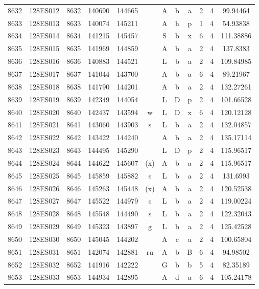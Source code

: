 \begin{tabular}{|*{12}{c|}}
8632 & 128ES012 & 8632 & 140690 & 144665 &  & A & b & a & 2 & 4 & 99.94464 \\ 
8633 & 128ES013 & 8633 & 140074 & 145211 &  & A & h & p & 1 & 4 & 54.93838 \\ 
8634 & 128ES014 & 8634 & 141215 & 145457 &  & S & b & x & 6 & 4 & 111.38886 \\ 
8635 & 128ES015 & 8635 & 141969 & 144859 &  & A & b & a & 2 & 4 & 137.8383 \\ 
8636 & 128ES016 & 8636 & 140883 & 144521 &  & L & b & a & 2 & 4 & 109.84985 \\ 
8637 & 128ES017 & 8637 & 141044 & 143700 &  & A & b & a & 6 & 4 & 89.21967 \\ 
8638 & 128ES018 & 8638 & 141790 & 144201 &  & A & b & a & 2 & 4 & 132.27261 \\ 
8639 & 128ES019 & 8639 & 142349 & 144054 &  & L & D & p & 2 & 4 & 101.66528 \\ 
8640 & 128ES020 & 8640 & 142437 & 143594 & w & L & D & x & 6 & 4 & 120.12128 \\ 
8641 & 128ES021 & 8641 & 143060 & 143903 & s & L & b & a & 2 & 4 & 132.04857 \\ 
8642 & 128ES022 & 8642 & 143422 & 144240 &  & A & b & a & 2 & 4 & 135.17114 \\ 
8643 & 128ES023 & 8643 & 144495 & 145290 &  & L & D & p & 2 & 4 & 115.96517 \\ 
8644 & 128ES024 & 8644 & 144622 & 145607 & (x) & A & b & a & 2 & 4 & 115.96517 \\ 
8645 & 128ES025 & 8645 & 145859 & 145882 & s & L & b & a & 2 & 4 & 131.6993 \\ 
8646 & 128ES026 & 8646 & 145263 & 145448 & (x) & A & b & a & 2 & 4 & 120.52538 \\ 
8647 & 128ES027 & 8647 & 145522 & 144979 & s & L & b & a & 2 & 4 & 119.00224 \\ 
8648 & 128ES028 & 8648 & 145548 & 144490 & s & L & b & a & 2 & 4 & 122.32043 \\ 
8649 & 128ES029 & 8649 & 145323 & 143897 & g & L & b & a & 2 & 4 & 125.42528 \\ 
8650 & 128ES030 & 8650 & 145045 & 144202 &  & A & c & a & 2 & 4 & 100.65804 \\ 
8651 & 128ES031 & 8651 & 142074 & 142881 & ru & A & b & B & 6 & 4 & 94.98502 \\ 
8652 & 128ES032 & 8652 & 141916 & 142222 &  & G & b & b & 5 & 4 & 82.35189 \\ 
8653 & 128ES033 & 8653 & 144934 & 142895 &  & A & d & a & 6 & 4 & 105.24178 \\ 

\end{tabular}
